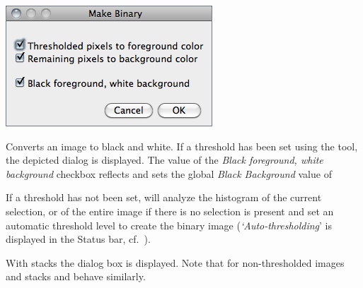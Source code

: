 \begin{minipage}[c][1\totalheight][t]{0.411\columnwidth}%
\includegraphics[scale=0.55]{images/MakeBinary}%
\end{minipage}%
\begin{minipage}[c][1\totalheight][t]{0.589\columnwidth}%
Converts an image to black and white. If a threshold has been set
using the 
tool, the depicted dialog is displayed. The value of the \emph{Black
foreground, white background} checkbox reflects and sets the global
\emph{Black Background} value of %
\end{minipage}\medskip{}


If a threshold has not been set, 
will analyze the histogram of the current selection, or of the entire
image if there is no selection is present and set an automatic threshold
level to create the binary image (\emph{`Auto-thresholding}' is
displayed in the Status bar, cf.\ ). 

With stacks the  dialog
box is displayed. Note that for non-thresholded images and stacks
 and 
behave similarly.




\subsubsection{\protect{}\label{sub:Convert-to-Mask}}

